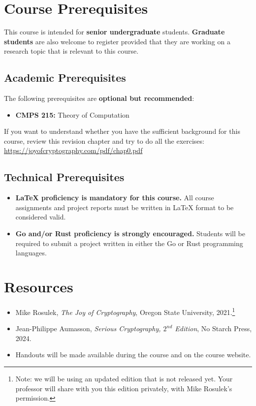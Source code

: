 \documentclass[10pt,a4paper,american]{exam}
\begin{document}
\section{Course Prerequisites}
This course is intended for \textbf{senior undergraduate} students. \textbf{Graduate students} are also welcome to register provided that they are working on a research topic that is relevant to this course.

\subsection{Academic Prerequisites}
The following prerequisites are \textbf{optional but recommended}:

\begin{itemize}
	\item \textbf{CMPS 215:} Theory of Computation
\end{itemize}

If you want to understand whether you have the sufficient background for this course, review this revision chapter and try to do all the exercises: \url{https://joyofcryptography.com/pdf/chap0.pdf}

\subsection{Technical Prerequisites}
\begin{itemize}
	\item \textbf{LaTeX proficiency is mandatory for this course.} All course assignments and project reports must be written in LaTeX format to be considered valid.
	\item \textbf{Go and/or Rust proficiency is strongly encouraged.} Students will be required to submit a project written in either the Go or Rust programming languages.
\end{itemize}

\section{Resources}
\begin{itemize}
	\item Mike Rosulek, \textit{The Joy of Cryptography}, Oregon State University, 2021.\footnote{Note: we will be using an updated edition that is not released yet. Your professor will share with you this edition privately, with Mike Rosulek's permission.}
	\item Jean-Philippe Aumasson, \textit{Serious Cryptography, $2^{nd}$ Edition}, No Starch Press, 2024.
	\item Handouts will be made available during the course and on the course website.
\end{itemize}
\end{document}
